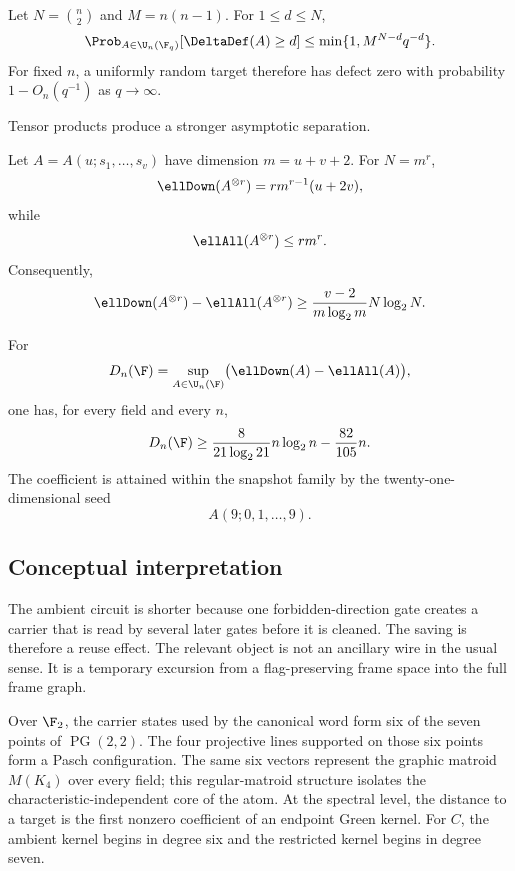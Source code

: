 \begin{corollary}\label{cor:finite-field-sparsity-intro}
Let $N=\binom n2$ and $M=n(n-1)$.  For $1\le d\le N$,
\[
\Prob_{A\in\U_n(\F_q)}[\DeltaDef(A)\ge d]
\le
\min\{1,M^{N-d}q^{-d}\}.
\]
For fixed $n$, a uniformly random target therefore has defect zero with probability $1-O_n(q^{-1})$ as $q\to\infty$.
\end{corollary}

Tensor products produce a stronger asymptotic separation.

\begin{theorem}\label{thm:tensor-main}
Let $A=A(u;s_1,\ldots,s_v)$ have dimension $m=u+v+2$.  For $N=m^r$,
\[
\ellDown(A^{\otimes r})
=r m^{r-1}(u+2v),
\]
while
\[
\ellAll(A^{\otimes r})
\le r m^r.
\]
Consequently,
\[
\ellDown(A^{\otimes r})-\ellAll(A^{\otimes r})
\ge
\frac{v-2}{m\log_2m}N\log_2N.
\]
\end{theorem}

\begin{corollary}\label{cor:nlogn-gap}
For
\[
D_n(\F)
=
\sup_{A\in\U_n(\F)}
\bigl(\ellDown(A)-\ellAll(A)\bigr),
\]
one has, for every field and every $n$,
\[
D_n(\F)
\ge
\frac{8}{21\log_2 21}n\log_2n
-
\frac{82}{105}n.
\]
The coefficient is attained within the snapshot family by the twenty-one-dimensional seed
\[
A(9;0,1,\ldots,9).
\]
\end{corollary}

\subsection*{Conceptual interpretation}

The ambient circuit is shorter because one forbidden-direction gate creates a carrier that is read by several later gates before it is cleaned.  The saving is therefore a reuse effect.  The relevant object is not an ancillary wire in the usual sense.  It is a temporary excursion from a flag-preserving frame space into the full frame graph.

Over $\F_2$, the carrier states used by the canonical word form six of the seven points of $\operatorname{PG}(2,2)$.  The four projective lines supported on those six points form a Pasch configuration.  The same six vectors represent the graphic matroid $M(K_4)$ over every field; this regular-matroid structure isolates the characteristic-independent core of the atom.  At the spectral level, the distance to a target is the first nonzero coefficient of an endpoint Green kernel.  For $C$, the ambient kernel begins in degree six and the restricted kernel begins in degree seven.

